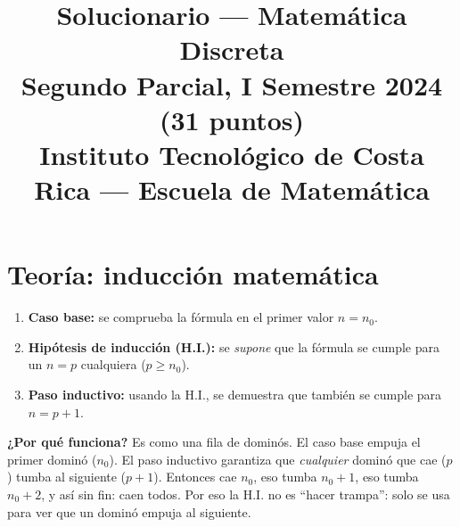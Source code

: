 \documentclass[11pt]{article}
\title{\textbf{Solucionario --- Matemática Discreta}\\[0.3em]\large Segundo Parcial, I Semestre 2024 (31 puntos)\\[0.3em]\normalsize Instituto Tecnológico de Costa Rica --- Escuela de Matemática}
\author{}
\date{}
\begin{document}
\maketitle
\tableofcontents

\clearpage
\section*{Teoría: inducción matemática}

\begin{minipage}[t]{0.55\textwidth}
\begin{enumerate}[label=(\alph*),leftmargin=1.6em]
\item \textbf{Caso base:} se comprueba la fórmula en el primer valor $n=n_0$.
\item \textbf{Hipótesis de inducción (H.I.):} se \emph{supone} que la fórmula se cumple para un $n=p$ cualquiera ($p\ge n_0$).
\item \textbf{Paso inductivo:} usando la H.I., se demuestra que también se cumple para $n=p+1$.
\end{enumerate}
\end{minipage}\hfill
\begin{minipage}[t]{0.42\textwidth}
\vspace{0pt}
\end{minipage}

\medskip
\textbf{¿Por qué funciona?} Es como una fila de dominós. El caso base empuja el primer dominó ($n_0$). El paso inductivo garantiza que \emph{cualquier} dominó que cae ($p$) tumba al siguiente ($p+1$). Entonces cae $n_0$, eso tumba $n_0+1$, eso tumba $n_0+2$, y así sin fin: caen todos. Por eso la H.I. no es ``hacer trampa'': solo se usa para ver que un dominó empuja al siguiente.
\end{document}
